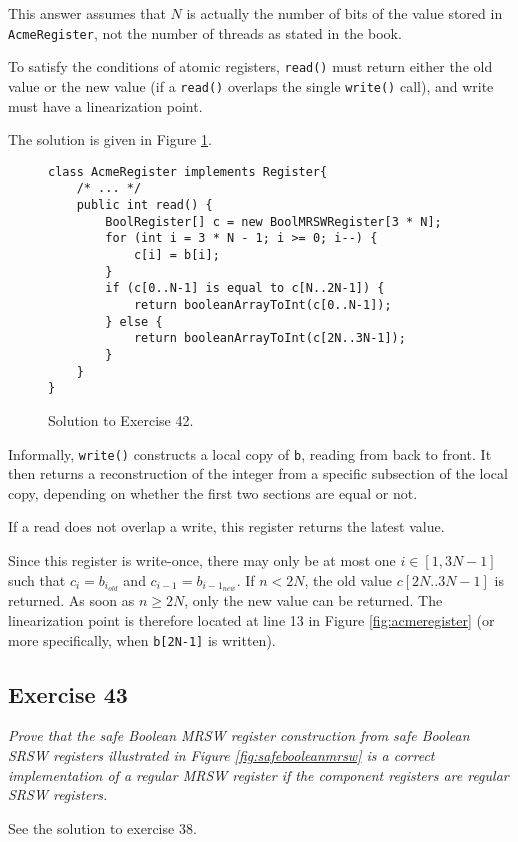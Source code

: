 \documentclass[a4paper,10pt]{article}
\begin{document}
\vspace{3mm}

This answer assumes that $N$ is actually the number of bits of the value stored
in \lstinline|AcmeRegister|, not the number of threads as stated in the book.

To satisfy the conditions of atomic registers, \lstinline|read()| must return either
the old value or the new value (if a \lstinline|read()| overlaps the single \lstinline|write()| call),
and write must have a linearization point.

The solution is given in Figure \ref{fig:acmesolution}.

\begin{figure}
\begin{lstlisting}
class AcmeRegister implements Register{
    /* ... */
    public int read() {
        BoolRegister[] c = new BoolMRSWRegister[3 * N];
        for (int i = 3 * N - 1; i >= 0; i--) {
            c[i] = b[i];
        }
        if (c[0..N-1] is equal to c[N..2N-1]) {
            return booleanArrayToInt(c[0..N-1]);
        } else {
            return booleanArrayToInt(c[2N..3N-1]);
        }
    }
}
\end{lstlisting}
\caption{Solution to Exercise 42.}
\label{fig:acmesolution}
\end{figure}

Informally, \lstinline|write()| constructs a local copy of \lstinline|b|, reading
from back to front. It then returns a reconstruction of the integer from a specific subsection
of the local copy, depending on whether the first two sections are equal or not.

If a read does not overlap a write, this register returns the latest value.

Since this register is write-once, there may only be at most one $i \in [1, 3N-1]$
such that $c_i = b_{i_{old}}$ and $c_{i - 1} = b_{{i - 1}_{new}}$. If $n < 2N$,
the old value $c[2N..3N-1]$ is returned. As soon as $n \geq 2N$, only the new value
can be returned. The linearization point is therefore located at line 13 in Figure
\ref{fig:acmeregister} (or more specifically, when \lstinline|b[2N-1]| is written).

\vspace{3mm}

\subsection{Exercise 43}

\emph{Prove that the safe Boolean MRSW register construction from safe
Boolean SRSW registers illustrated in Figure \ref{fig:safebooleanmrsw} is a correct implementation of a
regular MRSW register if the component registers are regular SRSW registers.}

\vspace{3mm}

See the solution to exercise 38.

\vspace{3mm}
\end{document}

